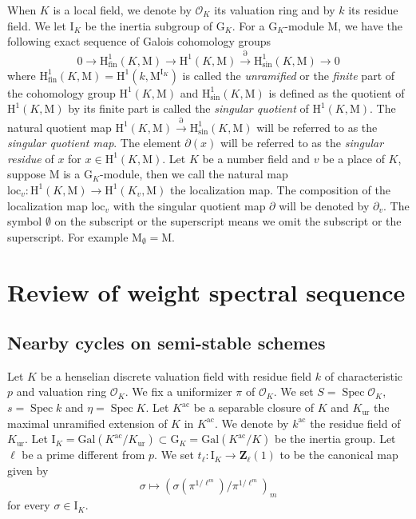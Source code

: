 \documentclass[10pt]{amsart}
\newcommand*\Z{\mathds{Z}}
\newcommand*\ZZ{|[draw,circle]| \Z_2}
\numberwithin{equation}{section}
\theoremstyle{plain}
\numberwithin{equation}{section}
\theoremstyle{definition}
\theoremstyle{remark}
\def\Gal{\mathrm{Gal}}
\def\sing{\mathrm{sin}}
\def\ac{\mathrm{ac}}
\def\ur{\mathrm{ur}}
\def\ac{\mathrm{ac}}
\DeclareMathOperator{\Spec}{Spec}
\def\calO{\mathcal{O}}
\def\ZZ{\mathbf{Z}}
\def\rmG{\mathrm{G}}
\def\rmH{\mathrm{H}}
\def\rmI{\mathrm{I}}
\def\rmM{\mathrm{M}}
\begin{document}
When $K$ is a local field, we denote by $\calO_{K}$ its valuation ring  and by $k$ its residue field. We let $\rmI_{K}$ be the inertia subgroup of $\rmG_{K}$. For a $\rmG_{K}$-module $\rmM$,  we have the following exact sequence of Galois cohomology groups
\begin{equation}\label{fin-sing}
0\rightarrow \rmH^{1}_{\mathrm{fin}}(K, \rmM)\rightarrow \rmH^{1}(K, \rmM)\xrightarrow{\partial} \rmH^{1}_{\sing}(K, \rmM)\rightarrow 0  
\end{equation}
where  $\rmH^{1}_{\mathrm{fin}}(K, \rmM)=\rmH^{1}(k, \rmM^{\rmI_{K}})$
is called the \emph{unramified} or the \emph{finite} part of the cohomology group $\rmH^{1}(K, \rmM)$ and $\rmH^{1}_{\mathrm{sin}}(K, \rmM)$ is defined as the quotient of $\rmH^{1}(K, \rmM)$ by its finite part is called the \emph{singular quotient} of  $\rmH^{1}(K, \rmM)$. The natural quotient map $\rmH^{1}(K, \rmM)\xrightarrow{\partial} \rmH^{1}_{\sing}(K, \rmM)$ will be referred to as the \emph{singular quotient map}. The element $\partial(x)$ will be referred to as the \emph{singular residue} of $x$ for  $x\in \rmH^{1}(K, \rmM)$. Let $K$ be a number field and $v$ be a place of $K$, suppose $\rmM$ is a $\rmG_{K}$-module, then we call the natural map $\mathrm{loc}_{v}: \rmH^{1}(K, \rmM)\rightarrow \rmH^{1}(K_{v}, \rmM)$ the localization map. The composition of the localization map $\mathrm{loc}_{v}$ with the singular quotient map $\partial$ will be denoted by $\partial_{v}$. The symbol ${\emptyset}$ on the subscript or the superscript means we omit the subscript or the superscript. For example $\rmM_{\emptyset}=\rmM$.


\section{Review of weight spectral sequence}
\subsection{Nearby cycles on semi-stable schemes} Let $K$ be a henselian discrete valuation field with residue field $k$ of characteristic $p$ and valuation ring $\calO_{K}$. We fix a uniformizer $\pi$ of $\calO_{K}$. We set $S=\Spec\calO_{K}$, $s=\Spec k$ and $\eta=\Spec K$. Let $K^{\ac}$ be a separable closure of $K$ and $K_{\ur}$ the maximal unramified extension of $K$ in $K^{\ac}$. We denote by $k^{\ac}$ the residue field of $K_{\ur}$. 
Let $\rmI_{K}=\Gal(K^{\ac}/K_{\ur})\subset \rmG_{K}=\Gal(K^{\ac}/K)$ be the inertia group. Let $\ell$ be a prime different from $p$. We set $t_{\ell}: \rmI_{K}\rightarrow \ZZ_{\ell}(1)$ to be the canonical map given by 
\begin{equation*}
\sigma \mapsto (\sigma(\pi^{1/\ell^{m}})/\pi^{1/\ell^{m}})_{m}
\end{equation*} 
for every $\sigma\in \rmI_{K}$. 
\end{document}
